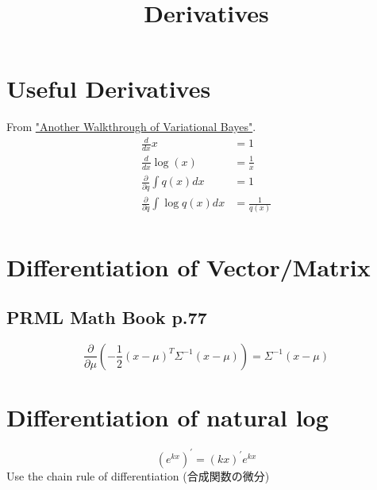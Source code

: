 \documentclass[a4paper,10.5pt]{jsarticle}  %
\begin{document}
\title{Derivatives}
\author{}
\date{}
\maketitle

\setcounter{tocdepth}{1}
\tableofcontents

\section{Useful Derivatives}
From \href{https://wiki.inf.ed.ac.uk/twiki/pub/MLforNLP/WebHome/bkj-VBwalkthrough.pdf}{"Another Walkthrough of Variational Bayes"}.
\begin{align*}
  \frac{d}{dx}x &= 1 \\
  \frac{d}{dx}\log(x) &= \frac{1}{x}\\
  \frac{\partial}{\partial q} \int q(x)dx &= 1\\
  \frac{\partial}{\partial q} \int \log q(x)dx &= \frac{1}{q(x)}\\
\end{align*}

\section{Differentiation of Vector/Matrix}

\subsection{PRML Math Book p.77}
$$\frac{\partial}{\partial \mu} \left( - \frac{1}{2} (x-\mu)^{T} \Sigma^{-1} (x-\mu) \right) = \Sigma^{-1} (x-\mu)$$


\section{Differentiation of natural log}
$$(e^{kx})^{'} = (kx)^{'} e^{kx}$$
Use the chain rule of differentiation (合成関数の微分)
\end{document}

